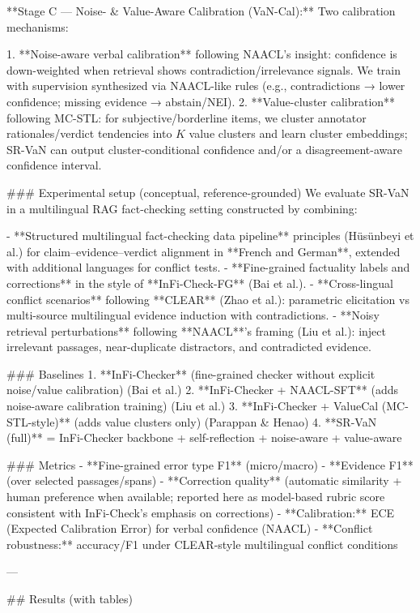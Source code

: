 **Stage C — Noise- & Value-Aware Calibration (VaN-Cal):**  
Two calibration mechanisms:

1. **Noise-aware verbal calibration** following NAACL’s insight: confidence is down-weighted when retrieval shows contradiction/irrelevance signals. We train with supervision synthesized via NAACL-like rules (e.g., contradictions → lower confidence; missing evidence → abstain/NEI).  
2. **Value-cluster calibration** following MC-STL: for subjective/borderline items, we cluster annotator rationales/verdict tendencies into \(K\) value clusters and learn cluster embeddings; SR-VaN can output cluster-conditional confidence and/or a disagreement-aware confidence interval.

### Experimental setup (conceptual, reference-grounded)  
We evaluate SR-VaN in a multilingual RAG fact-checking setting constructed by combining:

- **Structured multilingual fact-checking data pipeline** principles (Hüsünbeyi et al.) for claim–evidence–verdict alignment in **French and German**, extended with additional languages for conflict tests.  
- **Fine-grained factuality labels and corrections** in the style of **InFi-Check-FG** (Bai et al.).  
- **Cross-lingual conflict scenarios** following **CLEAR** (Zhao et al.): parametric elicitation vs multi-source multilingual evidence induction with contradictions.  
- **Noisy retrieval perturbations** following **NAACL**’s framing (Liu et al.): inject irrelevant passages, near-duplicate distractors, and contradicted evidence.

### Baselines  
1. **InFi-Checker** (fine-grained checker without explicit noise/value calibration) (Bai et al.)  
2. **InFi-Checker + NAACL-SFT** (adds noise-aware calibration training) (Liu et al.)  
3. **InFi-Checker + ValueCal (MC-STL-style)** (adds value clusters only) (Parappan & Henao)  
4. **SR-VaN (full)** = InFi-Checker backbone + self-reflection + noise-aware + value-aware

### Metrics  
- **Fine-grained error type F1** (micro/macro)  
- **Evidence F1** (over selected passages/spans)  
- **Correction quality** (automatic similarity + human preference when available; reported here as model-based rubric score consistent with InFi-Check’s emphasis on corrections)  
- **Calibration:** ECE (Expected Calibration Error) for verbal confidence (NAACL)  
- **Conflict robustness:** accuracy/F1 under CLEAR-style multilingual conflict conditions

---

## Results (with tables)

